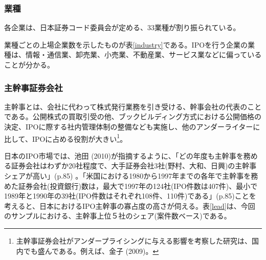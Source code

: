 \documentclass{jsarticle}
\begin{document}
\subsubsection{業種}
各企業は、日本証券コード委員会が定める、33業種が割り振られている。\par
業種ごとの上場企業数を示したものが表\ref{industry}である。IPOを行う企業の業種は、情報・通信業、卸売業、小売業、不動産業、サービス業などに偏っていることが分かる。

\subsubsection{主幹事証券会社}
主幹事とは、会社に代わって株式発行業務を引き受ける、幹事会社の代表のことである。公開株式の買取引受の他、ブックビルディング方式における公開価格の決定、IPOに際する社内管理体制の整備なども実施し、他のアンダーライターに比して、IPOに占める役割が大きい\footnote[9]{主幹事証券会社がアンダープライシングに与える影響を考察した研究は、国内でも盛んである。例えば、金子 (2009)\cite{kaneko}。}。\par
日本のIPO市場では、池田 (2010)\cite{ikeda2}が指摘するように、「どの年度も主幹事を務める証券会社はわずか20社程度で、大手証券会社3社(野村、大和、日興)の主幹事シェアが高い」(p.85) 。「米国における1980から1997年までの各年で主幹事を務めた証券会社(投資銀行)数は，最大で1997年の124社(IPO件数は407件)、最小で1989年と1990年の39社(IPO件数はそれぞれ108件、110件)である」(p.85)ことを考えると、日本におけるIPO主幹事の寡占度の高さが伺える。表\ref{lead}は、今回のサンプルにおける、主幹事上位５社のシェア(案件数ベース)である。\par
\end{document}
